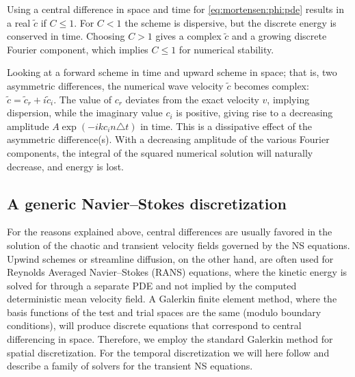 Using a central difference in space and time for
\eqref{eq:mortensen:phi:pde} results in a real $\tilde c$ if $C\leqslant
1$. For $C<1$ the scheme is dispersive, but the discrete energy is
conserved in time.  Choosing $C>1$ gives a complex $\tilde c$ and a
growing discrete Fourier component, which implies $C\leqslant1$ for
numerical stability.

Looking at a forward scheme in time and upward scheme in space; that is,
two asymmetric differences, the numerical wave velocity $\tilde c$
becomes complex: $\tilde c = \tilde c_r + i\tilde c_i$.  The value of
$c_r$ deviates from the exact velocity $v$, implying dispersion, while
the imaginary value $c_i$ is positive, giving rise to a decreasing
amplitude $A\exp{(-ikc_i n\triangle t)}$ in time.  This is a
dissipative effect of the asymmetric difference(s).  With a decreasing
amplitude of the various Fourier components, the integral of the
squared numerical solution will naturally decrease, and energy is
lost.

\subsection{A generic Navier--Stokes discretization}
\label{sec:mortensen:NS-solver}

For the reasons explained above, central differences are usually
favored in the solution of the chaotic and transient velocity fields
governed by the NS equations. Upwind schemes or streamline diffusion,
on the other hand, are often used for Reynolds Averaged Navier--Stokes
(RANS) equations, where the kinetic energy is solved for through a
separate PDE and not implied by the computed deterministic mean
velocity field. A Galerkin finite element method, where the basis
functions of the test and trial spaces are the same (modulo boundary
conditions), will produce discrete equations that correspond to
central differencing in space. Therefore, we employ the standard
Galerkin method for spatial discretization. For the temporal
discretization we will here follow 
\citet{SimoArmero1994} and describe a family of solvers for the
transient NS equations.


